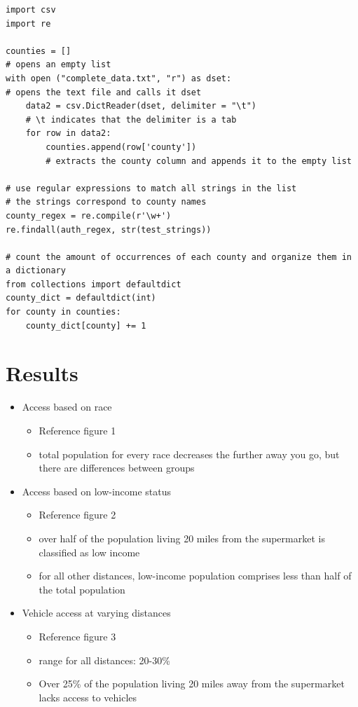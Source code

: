 \documentclass[letterpaper]{article} %
\begin{document}
\lstset{language=Python}
\begin{lstlisting}[frame=single]
import csv
import re

counties = []
# opens an empty list
with open ("complete_data.txt", "r") as dset:
# opens the text file and calls it dset
    data2 = csv.DictReader(dset, delimiter = "\t")
    # \t indicates that the delimiter is a tab
    for row in data2:
        counties.append(row['county'])
        # extracts the county column and appends it to the empty list

# use regular expressions to match all strings in the list 
# the strings correspond to county names 
county_regex = re.compile(r'\w+')
re.findall(auth_regex, str(test_strings))

# count the amount of occurrences of each county and organize them in a dictionary
from collections import defaultdict
county_dict = defaultdict(int)
for county in counties:
    county_dict[county] += 1
\end{lstlisting}

\section{Results}

\begin{itemize} \itemsep -.1cm
	\item Access based on race
		\begin{itemize}\itemsep -.1cm\vspace{-.25cm}
			\item Reference figure 1
			\item total population for every race decreases the further away you go, but there are differences between groups
		\end{itemize}
	\item Access based on low-income status
		\begin{itemize}\itemsep -.1cm\vspace{-.25cm}
			\item Reference figure 2
			\item over half of the population living 20 miles from the supermarket  is classified as low income
			\item for all other distances, low-income population comprises less than half  of the total population
		\end{itemize}
	\item Vehicle access at varying distances
		\begin{itemize}\itemsep -.1cm\vspace{-.25cm}
			\item Reference figure 3
			\item range for all distances: 20-30\%
			\item Over 25\% of the population living 20 miles away from the supermarket lacks access to vehicles
		\end{itemize}
\end{itemize}
\end{document}
